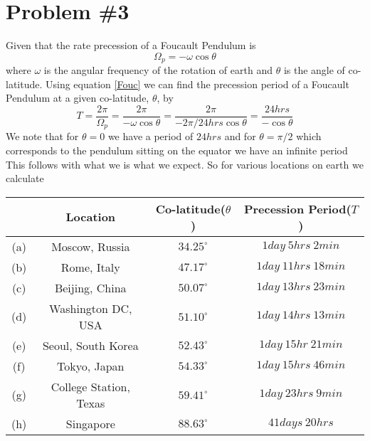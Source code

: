 \documentclass[11pt]{article}
\numberwithin{equation}{section}
\begin{document}
\section{Problem \#3}
Given that the rate precession of a Foucault Pendulum is 
\begin{equation}
\Omega_p = -\omega\cos\theta
\label{Fouc}
\end{equation}
where $\omega$ is the angular frequency of the rotation of earth and $\theta$ is the
angle of co-latitude. Using equation \ref{Fouc} we can find the precession period of a
Foucault Pendulum at a given co-latitude, $\theta$, by 
$$T = \frac{2\pi}{\Omega_p} = \frac{2\pi}{-\omega\cos\theta} =  \frac{2\pi}{-2\pi/24\unit{hrs}\cos\theta} = \frac{24\unit{hrs}}{-\cos\theta}$$
We note that for $\theta =0$ we have a period of $24\unit{hrs}$ and for $\theta=\pi/2$
which corresponds to the pendulum sitting on the equator we have an infinite period
This follows with what we is what we expect. So for various locations on earth we 
calculate

\begin{center}
\begin{tabular}{c|c|c|c}
&Location     &Co-latitude($\theta$)   &Precession Period($T$)\\
\hline
(a)      &Moscow, Russia         &$34.25^{\circ}$     &$1\unit{day}\ 5\unit{hrs}\ 2\unit{min}$\\
(b)      &Rome, Italy            &$47.17^{\circ}$     &$1\unit{day}\ 11\unit{hrs}\ 18\unit{min}$\\
(c)      &Beijing, China         &$50.07^{\circ}$     &$1\unit{day}\ 13\unit{hrs}\ 23\unit{min}$\\
(d)      &Washington DC, USA     &$51.10^{\circ}$     &$1\unit{day}\ 14\unit{hrs}\ 13\unit{min}$\\
(e)      &Seoul, South Korea     &$52.43^{\circ}$     &$1\unit{day}\ 15\unit{hr}\ 21\unit{min}$\\
(f)      &Tokyo, Japan           &$54.33^{\circ}$     &$1\unit{day}\ 15\unit{hrs}\ 46\unit{min}$\\
(g)      &College Station, Texas &$59.41^{\circ}$     &$1\unit{day}\ 23\unit{hrs}\ 9\unit{min}$\\
(h)      &Singapore              &$88.63^{\circ}$     &$41\unit{days}\ 20\unit{hrs}$
\end{tabular}
\end{center}
\end{document}
